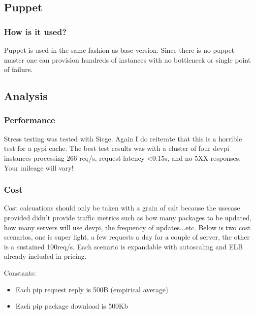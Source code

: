 \documentclass[12pt, letterpaper]{article}
\begin{document}
\subsection{Puppet}
\subsubsection{How is it used?}
Puppet is used in the same fashion as base version. Since there is no puppet master one can provision hundreds of instances
with no bottleneck or single point of failure.

\subsection{Analysis}
\subsubsection{Performance}
Stress testing was tested with Siege. Again I do reiterate that this is a horrible test for a pypi cache. The best test
results was with a cluster of four devpi instances processing 266 req/s, request latency \textless 0.15s, and no 5XX responses.
Your mileage will vary!

\subsubsection{Cost}
Cost calcuations should only be taken with a grain of salt because the usecase provided didn't provide traffic metrics such as
how many packages to be updated, how many servers will use devpi, the frequency of updates...etc. Below is two cost scenarios,
one is super light, a few requests a day for a couple of server, the other is a sustained 100req/s. Each scenario is 
expandable with autoscaling and ELB already included in pricing.

Constants:
\begin{itemize}
    \item Each pip request reply is 500B (empirical average)
    \item Each pip package download is 500Kb
\end{itemize}
\end{document}
